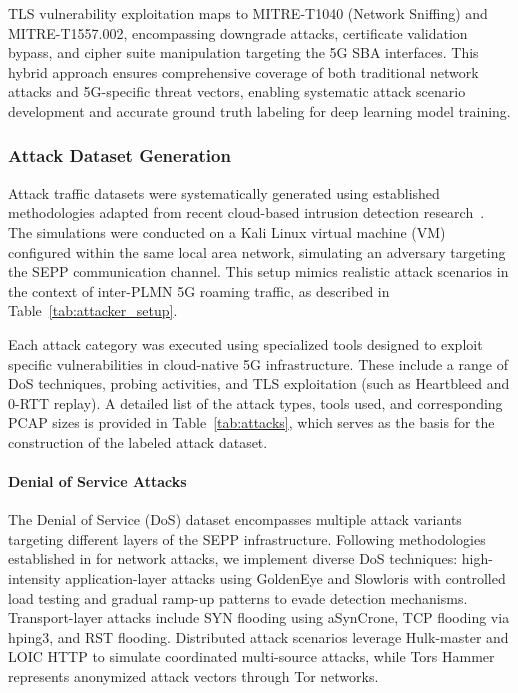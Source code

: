 \documentclass[journal,article,submit,moreauthors,pdftex]{Definitions/tsp}
\begin{document}
TLS vulnerability exploitation maps to MITRE-T1040 (Network Sniffing) and MITRE-T1557.002, encompassing downgrade attacks, certificate validation bypass, and cipher suite manipulation targeting the 5G SBA interfaces. This hybrid approach ensures comprehensive coverage of both traditional network attacks and 5G-specific threat vectors, enabling systematic attack scenario development and accurate ground truth labeling for deep learning model training.

\subsubsection{Attack Dataset Generation}

Attack traffic datasets were systematically generated using established methodologies adapted from recent cloud-based intrusion detection research~\cite{vashishthaStrengtheningCybersecurityTestCloudIDS2025}. The simulations were conducted on a Kali Linux virtual machine (VM) configured within the same local area network, simulating an adversary targeting the SEPP communication channel. This setup mimics realistic attack scenarios in the context of inter-PLMN 5G roaming traffic, as described in Table~\ref{tab:attacker_setup}.

Each attack category was executed using specialized tools designed to exploit specific vulnerabilities in cloud-native 5G infrastructure. These include a range of DoS techniques, probing activities, and TLS exploitation (such as Heartbleed and 0-RTT replay). A detailed list of the attack types, tools used, and corresponding PCAP sizes is provided in Table~\ref{tab:attacks}, which serves as the basis for the construction of the labeled attack dataset.

\paragraph{Denial of Service Attacks}
The Denial of Service (DoS) dataset encompasses multiple attack variants targeting different layers of the SEPP infrastructure. Following methodologies established in \cite{vashishthaStrengtheningCybersecurityTestCloudIDS2025} for network attacks, we implement diverse DoS techniques: high-intensity application-layer attacks using GoldenEye and Slowloris with controlled load testing and gradual ramp-up patterns to evade detection mechanisms. Transport-layer attacks include SYN flooding using aSynCrone, TCP flooding via hping3, and RST flooding. Distributed attack scenarios leverage Hulk-master and LOIC HTTP to simulate coordinated multi-source attacks, while Tors Hammer represents anonymized attack vectors through Tor networks.
\end{document}
